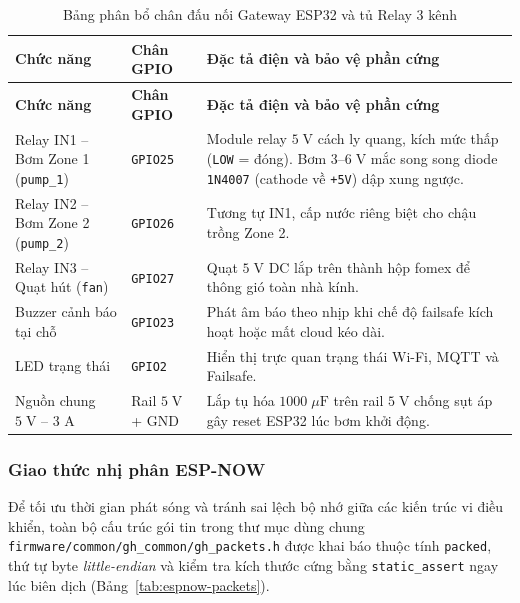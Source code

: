 \begingroup
\footnotesize
\setlength{\tabcolsep}{3.5pt}
\renewcommand{\arraystretch}{1.12}
\begin{longtable}{|>{\raggedright\arraybackslash}p{}|>{\centering\arraybackslash}p{}|>{\raggedright\arraybackslash}p{}|}
\caption{Bảng phân bổ chân đấu nối Gateway ESP32 và tủ Relay 3 kênh}\label{tab:gateway-wiring}\\
\hline
\textbf{Chức năng} & \textbf{Chân GPIO} & \textbf{Đặc tả điện và bảo vệ phần cứng} \\
\hline
\endfirsthead
\hline
\textbf{Chức năng} & \textbf{Chân GPIO} & \textbf{Đặc tả điện và bảo vệ phần cứng} \\
\hline
\endhead
Relay IN1 -- Bơm Zone 1 (\texttt{pump\_1}) & \texttt{GPIO25} & Module relay \(5\;\text{V}\) cách ly quang, kích mức thấp (\texttt{LOW} = đóng). Bơm \(3\text{--}6\;\text{V}\) mắc song song diode \texttt{1N4007} (cathode về \texttt{+5V}) dập xung ngược. \\
\hline
Relay IN2 -- Bơm Zone 2 (\texttt{pump\_2}) & \texttt{GPIO26} & Tương tự IN1, cấp nước riêng biệt cho chậu trồng Zone 2. \\
\hline
Relay IN3 -- Quạt hút (\texttt{fan}) & \texttt{GPIO27} & Quạt \(5\;\text{V DC}\) lắp trên thành hộp fomex để thông gió toàn nhà kính. \\
\hline
Buzzer cảnh báo tại chỗ & \texttt{GPIO23} & Phát âm báo theo nhịp khi chế độ failsafe kích hoạt hoặc mất cloud kéo dài. \\
\hline
LED trạng thái & \texttt{GPIO2} & Hiển thị trực quan trạng thái Wi-Fi, MQTT và Failsafe. \\
\hline
Nguồn chung \(5\;\text{V -- 3 A}\) & Rail \(5\;\text{V}\) + GND & Lắp tụ hóa \(1000\;\mu\text{F}\) trên rail \(5\;\text{V}\) chống sụt áp gây reset ESP32 lúc bơm khởi động. \\
\hline
\end{longtable}
\endgroup

\subsubsection{Giao thức nhị phân ESP-NOW}

Để tối ưu thời gian phát sóng và tránh sai lệch bộ nhớ giữa các kiến trúc vi điều khiển, toàn bộ cấu trúc gói tin trong thư mục dùng chung \texttt{firmware/common/gh\_common/gh\_packets.h} được khai báo thuộc tính \texttt{packed}, thứ tự byte \textit{little-endian} và kiểm tra kích thước cứng bằng \texttt{static\_assert} ngay lúc biên dịch (Bảng~\ref{tab:espnow-packets}).

